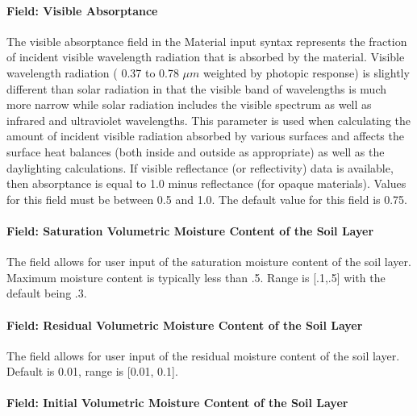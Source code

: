 \paragraph{Field: Visible Absorptance}\label{field-visible-absorptance-2}

The visible absorptance field in the Material input syntax represents the fraction of incident visible wavelength radiation that is absorbed by the material. Visible wavelength radiation ( 0.37 to 0.78 $\mu{}m$ weighted by photopic response) is slightly different than solar radiation in that the visible band of wavelengths is much more narrow while solar radiation includes the visible spectrum as well as infrared and ultraviolet wavelengths. This parameter is used when calculating the amount of incident visible radiation absorbed by various surfaces and affects the surface heat balances (both inside and outside as appropriate) as well as the daylighting calculations. If visible reflectance (or reflectivity) data is available, then absorptance is equal to 1.0 minus reflectance (for opaque materials). Values for this field must be between 0.5 and 1.0. The default value for this field is 0.75.

\paragraph{Field: Saturation Volumetric Moisture Content of the Soil Layer}\label{field-saturation-volumetric-moisture-content-of-the-soil-layer}

The field allows for user input of the saturation moisture content of the soil layer. Maximum moisture content is typically less than .5. Range is {[}.1,.5{]} with the default being .3.

\paragraph{Field: Residual Volumetric Moisture Content of the Soil Layer}\label{field-residual-volumetric-moisture-content-of-the-soil-layer}

The field allows for user input of the residual moisture content of the soil layer. Default is 0.01, range is {[}0.01, 0.1{]}.

\paragraph{Field: Initial Volumetric Moisture Content of the Soil Layer}\label{field-initial-volumetric-moisture-content-of-the-soil-layer}

